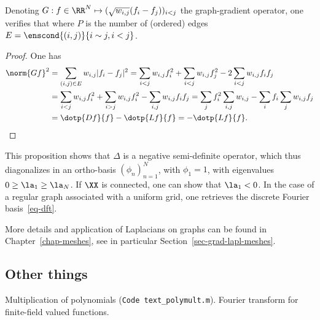\begin{prop}
Denoting $G : f \in \RR^N \mapsto ( \sqrt{w_{i,j}} (f_i-f_j) )_{i<j}$ the graph-gradient operator, one verifies that 
where $P$ is the number of (ordered) edges $E=\enscond{(i,j)}{i \sim j, i<j}$. 
\end{prop}
\begin{proof}
	One has 
	\begin{align*}
		\norm{Gf}^2 &= \sum_{(i,j) \in E} w_{i,j}|f_i-f_j|^2
				=\sum_{i<j}w_{i,j}f_i^2  + \sum_{i<j}w_{i,j}f_j^2 - 2 \sum_{i<j}w_{i,j}f_i f_j  \\
				&= \sum_{i<j}w_{i,j}f_i^2 + \sum_{i>j}w_{i,j}f_i^2- \sum_{i,j}w_{i,j}f_i f_j
				= \sum_j f_i^2 \sum_{i,j} w_{i,j} - \sum_if_i  \sum_j w_{i,j} f_j \\
				&= \dotp{Df}{f}-\dotp{Lf}{f}=-\dotp{Lf}{f}.
	\end{align*}
\end{proof}

This proposition shows that $\Delta$ is a negative semi-definite operator, which thus diagonalizes in an ortho-basis $(\phi_n)_{n=1}^N$, with $\phi_1=1$, with eigenvalues $0 \geq \la_1 \geq \la_N$. If $\XX$ is connected, one can show that $\la_1 <0$. In the case of a regular graph associated with a uniform grid, one retrieves the discrete Fourier basis~\eqref{eq-dft}. 

More details and application of Laplacians on graphs can be found in Chapter~\ref{chap-meshes}, see in particular Section~\ref{sec-grad-lapl-meshes}.



\subsection{Other things}

Multiplication of polynomials (\texttt{Code text\_polymult.m}).
%
Fourier transform for finite-field valued functions.




